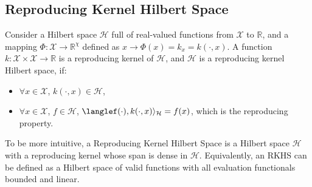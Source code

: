 \subsection{Reproducing Kernel Hilbert Space}
Consider a Hilbert space $\mathcal{H}$ full of real-valued functions from $\mathcal{X}$ to $\mathbb{R}$, and a mapping $\Phi: \mathcal{X}\rightarrow\mathbb{R}^\chi$ defined as $x\rightarrow\Phi(x)=k_x=k(\cdot , x)$. A function $k:\mathcal{X}\times\mathcal{X}\rightarrow\mathbb{R}$ is a 
reproducing kernel of $\mathcal{H}$, and $\mathcal{H}$ is a reproducing kernel Hilbert space, if:
\begin{itemize}
    \item $\forall x \in\mathcal{X}$, $k(\cdot, x)\in\mathcal{H}$,
    \item $\forall x \in\mathcal{X}$, $f\in\mathcal{H}$, $\langlef(\cdot),k(\cdot,x)\rangle_\mathcal{H}=f(x)$, which is the reproducing property.
\end{itemize}
To be more intuitive, a Reproducing Kernel Hilbert Space is a Hilbert space $\mathcal{H}$ with a reproducing kernel whose span is dense in $\mathcal{H}$. Equivalently, an RKHS can be defined as a Hilbert space of valid functions with all evaluation functionals bounded and linear. 

